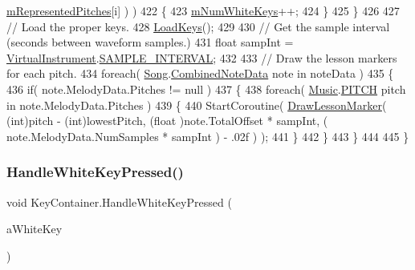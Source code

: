 \begin{DoxyCode}
      \hyperlink{group___key_contain_priv_var_ga103945a6efe3469191e5253d13fec5be}{mRepresentedPitches}[i] ) )
422             \{
423                 \hyperlink{group___key_contain_priv_var_ga7a5547a1fe5c40eac487fe6c826c8f9c}{mNumWhiteKeys}++;
424             \}
425         \}
426 
427         \textcolor{comment}{// Load the proper keys.}
428         \hyperlink{group___key_contain_priv_func_ga65f79700f265d2223681ac95981ab4a3}{LoadKeys}();
429 
430         \textcolor{comment}{// Get the sample interval (seconds between waveform samples.)}
431         \textcolor{keywordtype}{float} sampInt = \hyperlink{class_virtual_instrument}{VirtualInstrument}.\hyperlink{group___v_i_base_const_ga69a037919b64e1e3e0f2b949b2b6af2c}{SAMPLE\_INTERVAL};
432 
433         \textcolor{comment}{// Draw the lesson markers for each pitch.}
434         \textcolor{keywordflow}{foreach}( \hyperlink{class_song}{Song}.\hyperlink{group___song_const_struct_song_1_1_combined_note_data}{CombinedNoteData} note in noteData )
435         \{
436             \textcolor{keywordflow}{if}( note.MelodyData.Pitches != null )
437             \{
438                 \textcolor{keywordflow}{foreach}( \hyperlink{class_music}{Music}.\hyperlink{group___music_enums_ga508f69b199ea518f935486c990edac1d}{PITCH} pitch in note.MelodyData.Pitches )
439                 \{
440                     StartCoroutine( \hyperlink{group___key_contain_event_handlers_gac6b82feca83eaf5e3ce6901088bc552c}{DrawLessonMarker}( (\textcolor{keywordtype}{int})pitch - (\textcolor{keywordtype}{int})lowestPitch, (\textcolor{keywordtype}{float}
      )note.TotalOffset * sampInt, ( note.MelodyData.NumSamples * sampInt ) - .02f ) );
441                 \}
442             \}
443         \}
444 
445     \}
\end{DoxyCode}
\mbox{\label{group___key_contain_event_handlers_ga4e2c5e8be389a7514429910e7d61f028}} 
\subsubsection{\texorpdfstring{Handle\+White\+Key\+Pressed()}{HandleWhiteKeyPressed()}}
{\footnotesize\ttfamily void Key\+Container.\+Handle\+White\+Key\+Pressed (\begin{DoxyParamCaption}\item[{\hyperlink{class_white_key}{White\+Key}}]{a\+White\+Key }\end{DoxyParamCaption})\hspace{0.3cm}{\ttfamily [private]}}



